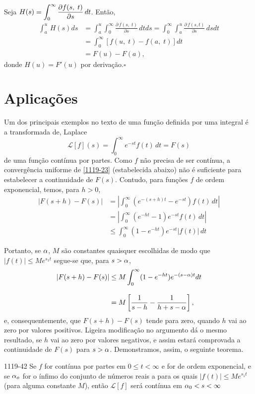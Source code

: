 \prova Seja
$\displaystyle{H(s)=\int_0^\infty\frac{\partial f(s,\; t)}{\partial s}\, dt }$.
Então,
\begin{align*}
  \int_a^u\,H(s)ds &=\int_a^u\int_0^\infty \frac{\partial\,f(s,\; t)}{\partial s}\, dtds
  = \int_0^\infty\int_a^u \frac{\partial\,f(s,t)}{\partial s}\, dsdt   \\[2ex]
  & =\int_0^\infty [f(u,\; t) - f(a,\; t)] dt  \\[2ex]
   &=F(u) - F(a),
\end{align*}
donde $H(u) = F'(u)$ por derivação.\hfill $\square$

\section{Aplicações}

Um dos principais exemplos no texto de uma função definida por uma
integral é a transformada de, Laplace
\begin{equation}\label{1119-23}
\mathcal{L}[f](s)= \int_0^\infty e^{-st}f(t)\,dt = F(s)
\end{equation}
de uma função contínua por partes. Como $f$ não precisa de ser
contínua, a convergência uniforme de \eqref{1119-23} (estabelecida
abaixo) não é suficiente para estabelecer a continuidade de
$F(s)$. Contudo, para funções $f$ de ordem exponencial, temos,
para $h > 0$,
\begin{align*}
  |F(s+h)-F(s)| & =\left|\int_0^\infty (e^{-(s+h)t}-e^{-st})f(t)\, dt  \right|\\[2ex]
  &= \left|\int_0^\infty (e^{-ht}-1)e^{-st}f(t)\, dt  \right|\\[2ex]
  &\leq \int_0^\infty (1-e^{-ht})e^{-st}|f(t)|\, dt
\end{align*}

Portanto, se $\alpha$, $M$ são constantes quaisquer escolhidas de
modo que $|f(t)| \leq  Me^{s_1t}$ segue-se que, para $s > \alpha$,
\begin{align*}
  |F(s+h)-F(s)| &\leq M \int_0^\infty (1-e^{-ht})e^{-(s-\alpha)t}dt  \\[2ex]
   &=M\left[\frac{1}{s-h}-\frac{1}{h+s-\alpha} \right],
\end{align*}
 e, consequentemente, que $F(s + h) - F(s)$ tende para zero, quando
$h$ vai ao zero por valores positivos. Ligeira modificação no
argumento dá o mesmo resultado, se $h$ vai ao zero por valores
negativos, e assim estará comprovada a continuidade de $F(s)$ para
$s> \alpha$. Demonstramos, assim, o seguinte teorema.

\begin{theoc}{}{1119-42} 
Se $f$ for contínua por partes em $0 \leq t <\infty$
e for de ordem exponencial, e se $\alpha_o$ for o ínfimo do conjunto
de números reais a para os quais $|f(t)|\leq Me^{s_1t}$ (para
alguma constante $M$), então $\mathcal{L}[f]$ será contínua em
$\alpha_{0} < s < \infty$
\end{theoc}

